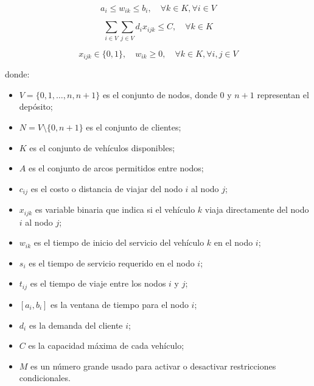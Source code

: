 \documentclass[12pt,titlepage,twoside,openright]{book}
\begin{document}
\begin{equation}
	a_i \leq w_{ik} \leq b_i, \quad \forall k \in K, \forall i \in V
	\label{eq:VRPTW_time_bounds}
\end{equation}

\begin{equation}
	\sum_{i \in V} \sum_{j \in V} d_i x_{ijk} \leq C, \quad \forall k \in K
	\label{eq:VRPTW_capacity}
\end{equation}

\begin{equation}
	x_{ijk} \in \{0, 1\}, \quad w_{ik} \geq 0, \quad \forall k \in K, \forall i,j \in V
	\label{eq:VRPTW_bin}
\end{equation}

\medskip
\noindent donde:
\begin{itemize}
	\item \(V = \{0, 1, \ldots, n, n+1\}\) es el conjunto de nodos, donde \(0\) y \(n+1\) representan el depósito;
	\item \(N = V \setminus \{0, n+1\}\) es el conjunto de clientes;
	\item \(K\) es el conjunto de vehículos disponibles;
	\item \(A\) es el conjunto de arcos permitidos entre nodos;
	\item \(c_{ij}\) es el costo o distancia de viajar del nodo \(i\) al nodo \(j\);
	\item \(x_{ijk}\) es variable binaria que indica si el vehículo \(k\) viaja directamente del nodo \(i\) al nodo \(j\);
	\item \(w_{ik}\) es el tiempo de inicio del servicio del vehículo \(k\) en el nodo \(i\);
	\item \(s_i\) es el tiempo de servicio requerido en el nodo \(i\);
	\item \(t_{ij}\) es el tiempo de viaje entre los nodos \(i\) y \(j\);
	\item \([a_i, b_i]\) es la ventana de tiempo para el nodo \(i\);
	\item \(d_i\) es la demanda del cliente \(i\);
	\item \(C\) es la capacidad máxima de cada vehículo;
	\item \(M\) es un número grande usado para activar o desactivar restricciones condicionales.
\end{itemize}
\end{document}
